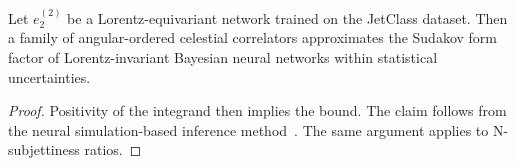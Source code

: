\begin{theorem}\label{thm:3}
Let $e_2^{(2)}$ be a Lorentz-equivariant network trained on the JetClass
dataset. Then a family of angular-ordered celestial correlators
approximates the Sudakov form factor of Lorentz-invariant Bayesian
neural networks within statistical uncertainties.
\end{theorem}

\begin{proof}
Positivity of the integrand then implies the bound. The claim follows
from the neural simulation-based inference
method~\cite{TPC:1476-A-Pedagogical-Introduction-to-Unitarity-Methods-September-22-2026}.
The same argument applies to N-subjettiness ratios.
\end{proof}

